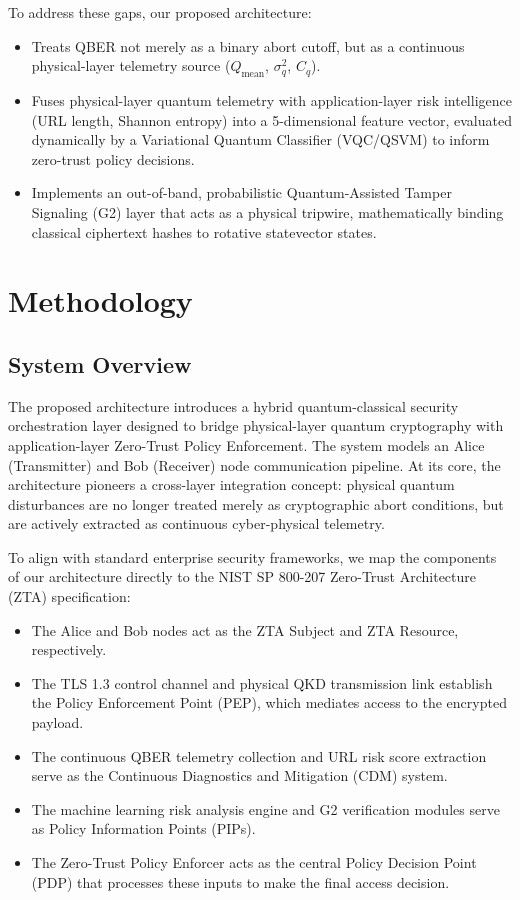 \documentclass[conference]{IEEEtran}
\begin{document}
To address these gaps, our proposed architecture:
\begin{itemize}
    \item Treats QBER not merely as a binary abort cutoff, but as a continuous physical-layer telemetry source ($Q_{\text{mean}}$, $\sigma^2_q$, $C_q$).
    \item Fuses physical-layer quantum telemetry with application-layer risk intelligence (URL length, Shannon entropy) into a 5-dimensional feature vector, evaluated dynamically by a Variational Quantum Classifier (VQC/QSVM) to inform zero-trust policy decisions.
    \item Implements an out-of-band, probabilistic Quantum-Assisted Tamper Signaling (G2) layer that acts as a physical tripwire, mathematically binding classical ciphertext hashes to rotative statevector states.
\end{itemize}

\section{Methodology}

\subsection{System Overview}
The proposed architecture introduces a hybrid quantum-classical security orchestration layer designed to bridge physical-layer quantum cryptography with application-layer Zero-Trust Policy Enforcement. The system models an Alice (Transmitter) and Bob (Receiver) node communication pipeline. At its core, the architecture pioneers a cross-layer integration concept: physical quantum disturbances are no longer treated merely as cryptographic abort conditions, but are actively extracted as continuous cyber-physical telemetry. 

To align with standard enterprise security frameworks, we map the components of our architecture directly to the NIST SP 800-207 Zero-Trust Architecture (ZTA) specification:
\begin{itemize}
    \item The Alice and Bob nodes act as the ZTA Subject and ZTA Resource, respectively.
    \item The TLS 1.3 control channel and physical QKD transmission link establish the Policy Enforcement Point (PEP), which mediates access to the encrypted payload.
    \item The continuous QBER telemetry collection and URL risk score extraction serve as the Continuous Diagnostics and Mitigation (CDM) system.
    \item The machine learning risk analysis engine and G2 verification modules serve as Policy Information Points (PIPs).
    \item The Zero-Trust Policy Enforcer acts as the central Policy Decision Point (PDP) that processes these inputs to make the final access decision.
\end{itemize}
\end{document}
